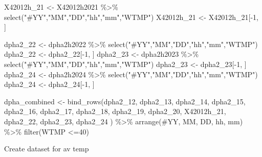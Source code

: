 \documentclass[
  letterpaper,
  DIV=11,
  numbers=noendperiod]{scrreprt}
\newenvironment{Shaded}{\begin{snugshade}}{\end{snugshade}}
\newcommand{\AttributeTok}[1]{\textcolor[rgb]{0.40,0.45,0.13}{#1}}
\newcommand{\DecValTok}[1]{\textcolor[rgb]{0.68,0.00,0.00}{#1}}
\newcommand{\FunctionTok}[1]{\textcolor[rgb]{0.28,0.35,0.67}{#1}}
\newcommand{\NormalTok}[1]{\textcolor[rgb]{0.00,0.23,0.31}{#1}}
\newcommand{\OtherTok}[1]{\textcolor[rgb]{0.00,0.23,0.31}{#1}}
\newcommand{\SpecialCharTok}[1]{\textcolor[rgb]{0.37,0.37,0.37}{#1}}
\newcommand{\StringTok}[1]{\textcolor[rgb]{0.13,0.47,0.30}{#1}}
\begin{document}
\begin{Shaded}
\begin{Highlighting}[]
\NormalTok{X42012h\_21 }\OtherTok{\textless{}{-}}\NormalTok{ X42012h2021 }\SpecialCharTok{\%\textgreater{}\%} \FunctionTok{select}\NormalTok{(}\StringTok{"\#YY"}\NormalTok{,}\StringTok{"MM"}\NormalTok{,}\StringTok{"DD"}\NormalTok{,}\StringTok{"hh"}\NormalTok{,}\StringTok{"mm"}\NormalTok{,}\StringTok{"WTMP"}\NormalTok{)}
\NormalTok{X42012h\_21 }\OtherTok{\textless{}{-}}\NormalTok{ X42012h\_21[}\SpecialCharTok{{-}}\DecValTok{1}\NormalTok{, ]}

\NormalTok{dpha2\_22 }\OtherTok{\textless{}{-}}\NormalTok{ dpha2h2022 }\SpecialCharTok{\%\textgreater{}\%} \FunctionTok{select}\NormalTok{(}\StringTok{"\#YY"}\NormalTok{,}\StringTok{"MM"}\NormalTok{,}\StringTok{"DD"}\NormalTok{,}\StringTok{"hh"}\NormalTok{,}\StringTok{"mm"}\NormalTok{,}\StringTok{"WTMP"}\NormalTok{) }
\NormalTok{dpha2\_22 }\OtherTok{\textless{}{-}}\NormalTok{ dpha2\_22[}\SpecialCharTok{{-}}\DecValTok{1}\NormalTok{, ]}
\NormalTok{dpha2\_23 }\OtherTok{\textless{}{-}}\NormalTok{ dpha2h2023 }\SpecialCharTok{\%\textgreater{}\%} \FunctionTok{select}\NormalTok{(}\StringTok{"\#YY"}\NormalTok{,}\StringTok{"MM"}\NormalTok{,}\StringTok{"DD"}\NormalTok{,}\StringTok{"hh"}\NormalTok{,}\StringTok{"mm"}\NormalTok{,}\StringTok{"WTMP"}\NormalTok{) }
\NormalTok{dpha2\_23 }\OtherTok{\textless{}{-}}\NormalTok{ dpha2\_23[}\SpecialCharTok{{-}}\DecValTok{1}\NormalTok{, ]}
\NormalTok{dpha2\_24 }\OtherTok{\textless{}{-}}\NormalTok{ dpha2h2024 }\SpecialCharTok{\%\textgreater{}\%} \FunctionTok{select}\NormalTok{(}\StringTok{"\#YY"}\NormalTok{,}\StringTok{"MM"}\NormalTok{,}\StringTok{"DD"}\NormalTok{,}\StringTok{"hh"}\NormalTok{,}\StringTok{"mm"}\NormalTok{,}\StringTok{"WTMP"}\NormalTok{) }
\NormalTok{dpha2\_24 }\OtherTok{\textless{}{-}}\NormalTok{ dpha2\_24[}\SpecialCharTok{{-}}\DecValTok{1}\NormalTok{, ]}

\NormalTok{dpha\_combined }\OtherTok{\textless{}{-}} \FunctionTok{bind\_rows}\NormalTok{(dpha2\_12, dpha2\_13, dpha2\_14, dpha2\_15, dpha2\_16, dpha2\_17, dpha2\_18, dpha2\_19, dpha2\_20, X42012h\_21, dpha2\_22, dpha2\_23, dpha2\_24}
\NormalTok{) }\SpecialCharTok{\%\textgreater{}\%}
  \FunctionTok{arrange}\NormalTok{(}\StringTok{\textasciigrave{}}\AttributeTok{\#YY}\StringTok{\textasciigrave{}}\NormalTok{, MM, DD, hh, mm) }\SpecialCharTok{\%\textgreater{}\%}
  \FunctionTok{filter}\NormalTok{(WTMP }\SpecialCharTok{\textless{}=}\DecValTok{40}\NormalTok{)}
\end{Highlighting}
\end{Shaded}

Create dataset for av temp
\end{document}
